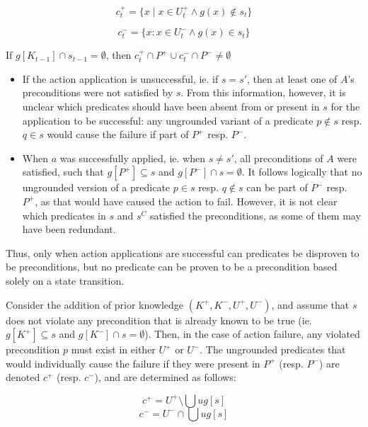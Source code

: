\documentclass[../Master.tex]{subfiles}
\begin{document}
\[ c_t^+ = \{ x \; | \; x \in U_t^+ \land g(x) \notin s_t \} \]

\[ c_t^- = \{ x : x \in U_t^- \land g(x) \in s_t \} \]

\begin{cor}
    If $g \left[ K_{t-1} \right] \cap s_{t-1} = \emptyset$, then $c_t^+ \cap P^+ \cup c_t^- \cap P^- \neq \emptyset$
\end{cor}

\begin{itemize}
    \item If the action
    application is unsuccessful, ie. if $s=s'$, then at least one of $A$'s
    preconditions were not satisfied by $s$. From this information, however, it
    is unclear which predicates should have been absent from or present in $s$
    for the application to be successful: any ungrounded variant of a predicate
    $p\notin s$ resp. $q\in s$ would cause the failure if part of $P^{+}$ resp.
    $P^{-}$.

    \item When $a$ was successfully applied, ie. when $s\neq s'$, all
    preconditions of $A$ were satisfied, such that $g\left[P^{+}\right]\subseteq
    s$ and $g\left[P^{-}\right]\cap s=\emptyset$. It follows logically that no
    ungrounded version of a predicate $p\in s$ resp. $q\notin s$ can be part of
    $P^{-}$ resp. $P^{+}$, as that would have caused the action to fail.
    However, it is not clear which predicates in $s$ and $s^{C}$ satisfied the
    preconditions, as some of them may have been redundant.
\end{itemize}
Thus,     only when action applications are successful can predicates be
disproven to     be preconditions, but no predicate can be proven to be a
precondition based     solely on a state transition.

Consider the addition of prior knowledge $\left(K^{+},K^{-},U^{+},U^{-}\right)$,
and assume that $s$ does not violate any precondition that is already known to
be true (ie. $g\left[K^{+}\right]\subseteq s$ and $g\left[K^{-}\right]\cap
s=\emptyset$). Then, in the case of action failure, any violated precondition
$p$ must exist in either $U^{+}$ or $U^{-}$. The ungrounded predicates that
would individually cause the failure if they were present in $P^{+}$ (resp.
$P^{-}$) are denoted $c^{+}$ (resp. $c^{-}$), and are determined as follows:

\[ c^{+}=U^{+}\setminus\bigcup ug\left[s\right] \] \[ c^{-}=U^{-}\cap\bigcup
ug\left[s\right] \]
\end{document}
